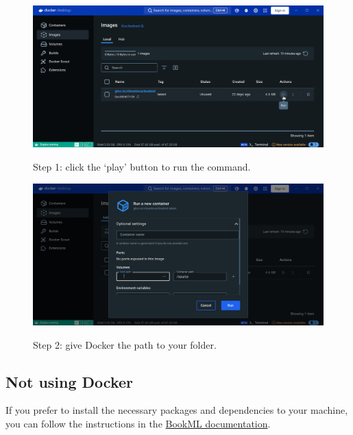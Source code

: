 \begin{figure}[h!]
    \centering
    \includegraphics[width=\textwidth, alt={A screenshot of Docker Desktop, with the cursor placed on the ``Run'' button.}]{img/docker_desktop_run.png}
    \caption{Step 1: click the `play' button to run the command.}
    \label{fig:docker_desktop_run}
\end{figure}

\begin{figure}[h!]
    \centering
    \includegraphics[width=\textwidth, alt={A screenshot of Docker Desktop, showing where to input the folder path.}]{img/docker_desktop_path.png}
    \caption{Step 2: give Docker the path to your folder.}
    \label{fig:docker_desktop_path}
\end{figure}

\subsection{Not using Docker}
\label{ssec:install}

If you prefer to install the necessary packages and dependencies to your machine, you can follow the instructions in the \href{https://vlmantova.github.io/bookmlleeds/#S1}{BookML documentation}.





